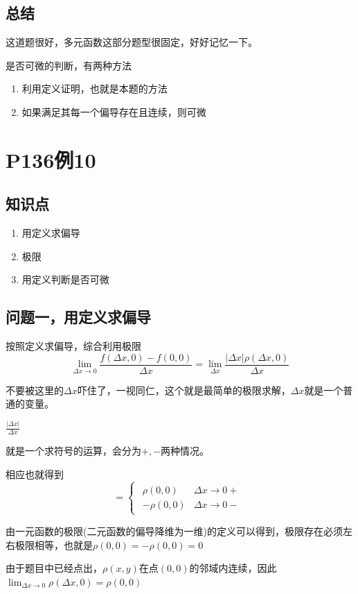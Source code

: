 \documentclass[a4paper]{ctexart}
\begin{document}
\begin{multicols}{2}
\subsection{总结}
\par 这道题很好，多元函数这部分题型很固定，好好记忆一下。 
\par 是否可微的判断，有两种方法
\begin{enumerate}
    \item 利用定义证明，也就是本题的方法
    \item 如果满足其每一个偏导存在且连续，则可微
\end{enumerate}


\section{P136例10}
\subsection{知识点}
\begin{enumerate}
    \item 用定义求偏导
    \item 极限
    \item 用定义判断是否可微
\end{enumerate}

\subsection{问题一，用定义求偏导}
\par 按照定义求偏导，综合利用极限
$$
\lim_{\Delta x\rightarrow 0} 
{
    \frac{
        f(\Delta x, 0) - f(0,0)
    }
    {\Delta x}
}
=
\lim_{\Delta x}
{
    \frac{
        \left| \Delta x \right| \rho(\Delta x,0)
    }
    {\Delta x}
}
$$
\par
不要被这里的$\Delta x$吓住了，一视同仁，这个就是最简单的极限求解，$\Delta x$就是一个普通的变量。
\par
$
\frac{
    \left| \Delta x \right| 
}
{\Delta x}
$
\par
就是一个求符号的运算，会分为$+,-$两种情况。
\par
相应也就得到
$$
= 
\begin{cases}
    \begin{array}{ll}
    \rho(0,0)   &   \Delta x \rightarrow 0+\\
    -\rho(0,0)  &   \Delta x \rightarrow 0-
    \end{array}
\end{cases}
$$
\par
由一元函数的极限(二元函数的偏导降维为一维)的定义可以得到，极限存在必须左右极限相等，也就是$\rho(0,0) = -\rho(0,0) = 0$
\par
由于题目中已经点出，$\rho(x,y)$在点$(0,0)$的邻域内连续，因此$\lim_{\Delta x\rightarrow 0}{\rho(\Delta x,0)} = \rho(0,0)$



\end{multicols}
\end{document}
